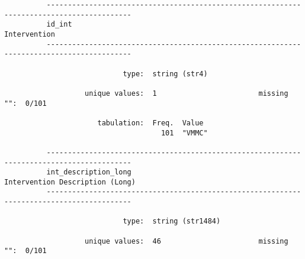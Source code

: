 \documentclass{article}
\begin{document}
\begin{verbatim}
          ------------------------------------------------------------------------------------------
          id_int                                                                        Intervention
          ------------------------------------------------------------------------------------------
          
                            type:  string (str4)
          
                   unique values:  1                        missing "":  0/101
          
                      tabulation:  Freq.  Value
                                     101  "VMMC"
          
          ------------------------------------------------------------------------------------------
          int_description_long                                       Intervention Description (Long)
          ------------------------------------------------------------------------------------------
          
                            type:  string (str1484)
          
                   unique values:  46                       missing "":  0/101
          

\end{verbatim}
\end{document}
